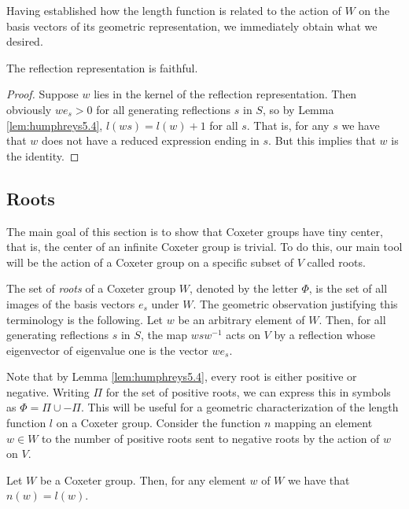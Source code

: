 \documentclass[main.tex]{subfiles}
\begin{document}
Having established how the length function is related to the 
action of $W$ on the basis vectors of its geometric 
representation, we immediately obtain what we desired.

\begin{theorem}
	The reflection representation is faithful.
\end{theorem}

\begin{proof}
	Suppose $w$ lies in the kernel of the reflection
	representation. 
	Then obviously $we_s > 0$ for all generating 
	reflections $s$ in $S$, so by 
	Lemma \ref{lem:humphreys5.4}, 
	$l(ws) = l(w) + 1$ for 
	all $s$. That is, for any $s$ we have that $w$ does not 
	have a 
	reduced expression ending in $s$. But this implies that 
	$w$ is the identity.
\end{proof}

\subsection{Roots}\label{subsec:roots}
The main goal of this section is to show that Coxeter groups 
have tiny center, that is, the center of an infinite Coxeter 
group is trivial. To do this, our main tool will be the action 
of a Coxeter group on a specific subset of $V$ called roots.

The set of \textit{roots} of a Coxeter group $W$, denoted by the 
letter $\Phi$, is the set of all images of the basis vectors 
$e_s$ under $W$. The geometric observation justifying this 
terminology is the following. Let $w$ be an arbitrary element of 
$W$. Then, for all generating reflections $s$ in $S$, the map 
$wsw^{-1}$ acts on $V$ by a reflection whose eigenvector of 
eigenvalue one is the vector $we_s$.

Note that by Lemma \ref{lem:humphreys5.4}, every root is either 
positive or negative. Writing $\Pi$ for the set of positive 
roots, we can express this in symbols as $\Phi = \Pi \cup -\Pi$. 
This will be useful for a geometric characterization of the 
length function $l$ on a Coxeter group. Consider the function 
$n$ mapping an element $w \in W$ to the number of positive roots 
sent to negative roots by the action of $w$ on $V$.

\begin{proposition}\label{prop:n=l}
	Let $W$ be a Coxeter group. Then, for any element $w$ of 
	$W$ we have that $n(w) = l(w)$.
\end{proposition}
\end{document}
